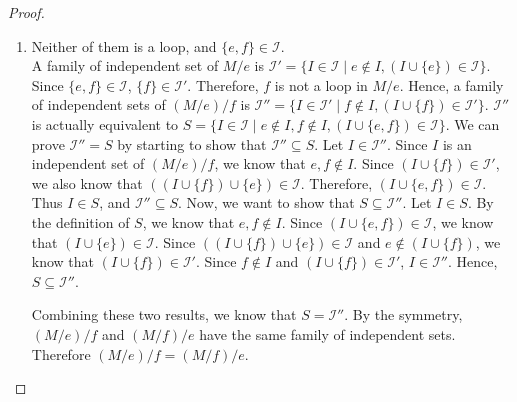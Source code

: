 \begin{proof}
\begin{enumerate}
\item Neither of them is a loop, and $\{ e, f \} \in \mathcal{I}$. \\
A family of independent set of $M / e$ is $\mathcal{I}' = \{ I \in \mathcal{I} \mid e \notin I, (I \cup \{ e \}) \in \mathcal{I} \}$.
Since $\{ e, f \} \in \mathcal{I}$, $\{ f \} \in \mathcal{I}'$. 
Therefore, $f$ is not a loop in $M / e$.
Hence, a family of independent sets of $(M / e) / f$ is $\mathcal{I}'' = \{ I \in \mathcal{I}' \mid f \notin I, (I \cup \{ f \}) \in \mathcal{I}' \}$.
$\mathcal{I}''$ is actually equivalent to $S = \{ I \in \mathcal{I} \mid e \notin I, f \notin I, (I \cup \{ e, f \}) \in \mathcal{I} \}$.
We can prove $\mathcal{I}'' = S$ by starting to show that $\mathcal{I}'' \subseteq S$.
Let $I \in \mathcal{I}''$.
Since $I$ is an independent set of $(M / e) / f$, we know that $e, f \notin I$.
Since $(I \cup \{ f \}) \in \mathcal{I}'$, we also know that $((I \cup \{ f \}) \cup \{ e \}) \in \mathcal{I}$.
Therefore, $(I \cup \{ e, f \}) \in \mathcal{I}$.
Thus $I \in S$, and $\mathcal{I}'' \subseteq S$.
Now, we want to show that $S \subseteq \mathcal{I}''$. 
Let $I \in S$. By the definition of $S$, we know that $e, f \notin I$.
Since $(I \cup \{ e, f \}) \in \mathcal{I}$, we know that $(I \cup \{ e \}) \in \mathcal{I}$.
Since $((I \cup \{ f \}) \cup \{ e \}) \in \mathcal{I}$ and $e \notin (I \cup \{ f \})$, we know that $(I \cup \{ f \}) \in \mathcal{I}'$.
Since $f \notin I$ and $(I \cup \{ f \}) \in \mathcal{I}'$, $I \in \mathcal{I}''$.
Hence, $S \subseteq \mathcal{I}''$.

Combining these two results, we know that $S = \mathcal{I}''$.
By the symmetry, $(M / e) / f$ and $(M / f) / e$ have the same family of independent sets.
Therefore $(M / e) / f = (M / f) / e$.


\end{enumerate}
\end{proof}
